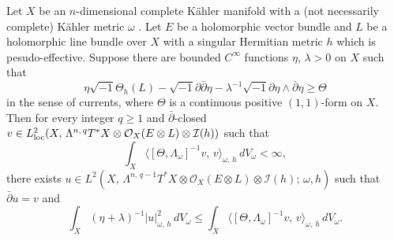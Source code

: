 \begin{conjecture}
  Let $X$ be an $n$-dimensional complete K\"ahler manifold with a (not necessarily complete) K\"ahler metric $\omega$ . Let $E$ be a holomorphic vector bundle and  $L$ be a holomorphic line bundle over $X$ with a singular Hermitian metric $h$ which is pesudo-effective. Suppose there are bounded $C^{\infty}$ functions $\eta$, $\lambda>0$ on $X$ such that
\begin{equation}\label{ineq: curvature condition}
  \eta\sqrt {-1}\Theta_h(L)-\sqrt{-1}\partial\bar{\partial}\eta-\lambda^{-1}\sqrt{-1}\partial\eta\wedge \bar{\partial}\eta\ge \Theta
\end{equation}
in the sense of currents, where $\Theta$ is a continuous positive $(1,1)$-form on $X$. Then for every integer $q\geq 1$ and $\bar{\partial}$-closed $v\in L^2_{\rm loc}(X,\, \Lambda^{n,\, q} T^{\ast}X \otimes \mathcal{O}_X (E\otimes L)\otimes \mathcal{I}(h))$ such that
  $$
  \int_X \big\langle[\Theta, \Lambda_{\omega}]^{-1}v,\, v\big\rangle_{\omega,\,h}\,dV_{\omega}<\infty,
  $$
there exists $u\in L^2(X,\, \Lambda^{n,\, q-1} T^{\ast}X \otimes \mathcal{O}_X (E\otimes L)\otimes \mathcal{I}(h);\, \omega, h)$ such that $\bar{\partial}u=v$ and
\begin{equation}\label{ineq:L^2 estimate for solution}
  \int_X (\eta+\lambda)^{-1}|u|^2_{\omega,\,h}\,dV_{\omega}\leq \int_X \big\langle[\Theta, \Lambda_{\omega}]^{-1}v,\, v\big\rangle_{\omega,\,h}\,dV_{\omega}.
\end{equation}
\end{conjecture}

